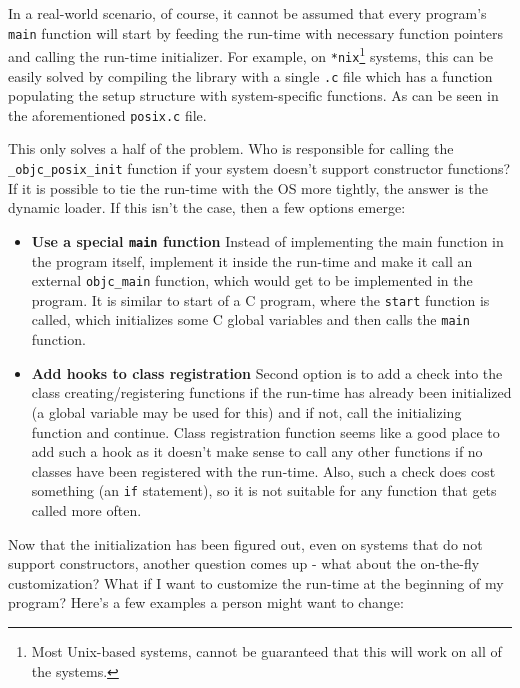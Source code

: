 In a real-world scenario, of course, it cannot be assumed that every program's \verb=main= function will start by feeding the run-time with necessary function pointers and calling the run-time initializer. For example, on \verb=*nix=\footnote{Most Unix-based systems, cannot be guaranteed that this will work on all of the systems.} systems, this can be easily solved by compiling the library with a single \verb=.c= file which has a function populating the setup structure with system-specific functions. As can be seen in the aforementioned \verb=posix.c= file.

This only solves a half of the problem. Who is responsible for calling the \verb=_objc_posix_init= function if your system doesn't support constructor functions? If it is possible to tie the run-time with the OS more tightly, the answer is the dynamic loader. If this isn't the case, then a few options emerge:

\begin{itemize}
  \item{\bf{Use a special \verb=main= function}} Instead of implementing the main function in the program itself, implement it inside the run-time and make it call an external \verb=objc_main= function, which would get to be implemented in the program. It is similar to start of a C program, where the \verb=start= function is called, which initializes some C global variables and then calls the \verb=main= function.
  \item{\bf{Add hooks to class registration}} Second option is to add a check into the class creating/registering functions if the run-time has already been initialized (a global variable may be used for this) and if not, call the initializing function and continue. Class registration function seems like a good place to add such a hook as it doesn't make sense to call any other functions if no classes have been registered with the run-time. Also, such a check does cost something (an \verb=if= statement), so it is not suitable for any function that gets called more often.
\end{itemize}

Now that the initialization has been figured out, even on systems that do not support constructors, another question comes up - what about the on-the-fly customization? What if I want to customize the run-time at the beginning of my program? Here's a few examples a person might want to change:

